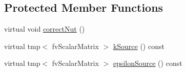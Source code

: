 \subsection*{Protected Member Functions}
\begin{DoxyCompactItemize}
\item 
virtual void \hyperlink{classFoam_1_1RASModels_1_1porousKEpsilon2PhaseCorrected_aaffe89433f18f1ee4137486e19219448}{correct\+Nut} ()
\item 
virtual tmp$<$ fv\+Scalar\+Matrix $>$ \hyperlink{classFoam_1_1RASModels_1_1porousKEpsilon2PhaseCorrected_abd7aa1bd65c38f9773745c8d98a2fed0}{k\+Source} () const
\item 
virtual tmp$<$ fv\+Scalar\+Matrix $>$ \hyperlink{classFoam_1_1RASModels_1_1porousKEpsilon2PhaseCorrected_a11abcc44df285cf748c77aa0a7cac6b8}{epsilon\+Source} () const
\end{DoxyCompactItemize}
